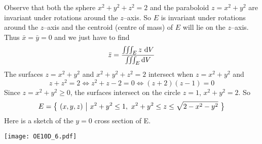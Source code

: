 \begin{solution}
Observe that both the sphere $x^2+y^2+z^2=2$
and the paraboloid $z=x^2+y^2$  are invariant under rotations
around the $z$--axis. So $E$ is invariant under rotations around the
$z$--axis and the centroid (centre of mass) of $E$ will lie on the
$z$--axis. Thus $\bar x=\bar y=0$ and we just have to find
\begin{align*}
\bar z = \frac{\iiint_E z\ \mathrm{d}V}{\iiint_E\mathrm{d}V}
\end{align*} 
The surfaces $z = x^2 + y^2$ and $x^2 + y^2 + z^2 = 2$
intersect when $z=x^2+y^2$ and
\begin{equation*}
z+z^2=2
\iff z^2+z-2=0
\iff(z+2)(z-1)=0
\end{equation*}
Since $z=x^2+y^2\ge 0$, the surfaces intersect on the circle $z=1$,
$x^2+y^2=2$. So 
\begin{equation*}
E = \Set{(x,y,z)}{ x^2+y^2\le 1,\ x^2+y^2\le z\le \sqrt{2-x^2-y^2}}
\end{equation*}
Here is a sketch of the $y=0$ cross section of E.
\begin{center}
     \texttt{[image: OE10D\_6.pdf]}
\end{center}


\end{solution}
